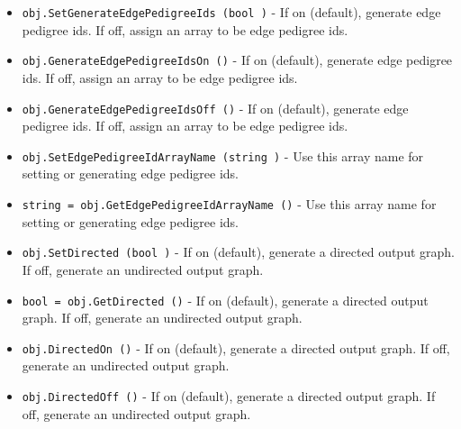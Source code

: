 \begin{itemize}
\item  \verb|obj.SetGenerateEdgePedigreeIds (bool )| -  If on (default), generate edge pedigree ids.
 If off, assign an array to be edge pedigree ids.

\item  \verb|obj.GenerateEdgePedigreeIdsOn ()| -  If on (default), generate edge pedigree ids.
 If off, assign an array to be edge pedigree ids.

\item  \verb|obj.GenerateEdgePedigreeIdsOff ()| -  If on (default), generate edge pedigree ids.
 If off, assign an array to be edge pedigree ids.

\item  \verb|obj.SetEdgePedigreeIdArrayName (string )| -  Use this array name for setting or generating edge pedigree ids.

\item  \verb|string = obj.GetEdgePedigreeIdArrayName ()| -  Use this array name for setting or generating edge pedigree ids.

\item  \verb|obj.SetDirected (bool )| -  If on (default), generate a directed output graph.
 If off, generate an undirected output graph.

\item  \verb|bool = obj.GetDirected ()| -  If on (default), generate a directed output graph.
 If off, generate an undirected output graph.

\item  \verb|obj.DirectedOn ()| -  If on (default), generate a directed output graph.
 If off, generate an undirected output graph.

\item  \verb|obj.DirectedOff ()| -  If on (default), generate a directed output graph.
 If off, generate an undirected output graph.

\end{itemize}
